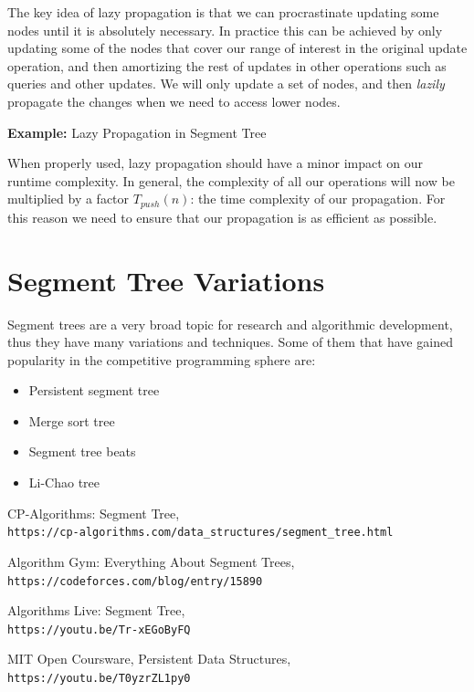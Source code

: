 \documentclass{article}
\begin{document}
The key idea of lazy propagation is that we can procrastinate updating some nodes until it is absolutely necessary. In practice this can be achieved by only updating some
of the nodes that cover our range of interest in the original update operation, and then amortizing the rest of updates in other operations such as queries and other updates. We will only update a set of nodes, and then \textit{lazily} propagate the changes when we need to access lower nodes.

\textbf{Example:} Lazy Propagation in Segment Tree

When properly used, lazy propagation should have a minor impact on our runtime complexity. In general, the complexity of all our operations will now be multiplied by a factor $T_{push}(n)$: the time complexity of our propagation. For this reason we need to ensure that our propagation is as efficient as possible.

\section{Segment Tree Variations}

Segment trees are a very broad topic for research and algorithmic development, thus they have many variations and techniques. Some of them that have gained popularity in the competitive programming sphere are:

\begin{itemize}
	\item Persistent segment tree
	\item Merge sort tree
	\item Segment tree beats
	\item Li-Chao tree
\end{itemize}

\begin{thebibliography}{9}
		CP-Algorithms: Segment Tree,\\
		\texttt{https://cp-algorithms.com/data\_structures/segment\_tree.html}

		Algorithm Gym: Everything About Segment Trees,\\
		\texttt{https://codeforces.com/blog/entry/15890}

		Algorithms Live: Segment Tree,\\
		\texttt{https://youtu.be/Tr-xEGoByFQ}
	
		MIT Open Coursware, Persistent Data Structures,\\
		\texttt{https://youtu.be/T0yzrZL1py0}
\end{thebibliography}
\end{document}
